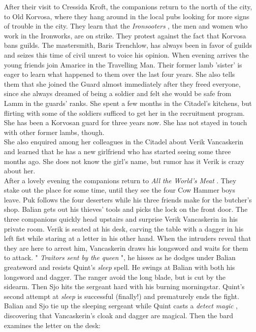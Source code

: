 After their visit to Cressida Kroft, the companions return to the north of the city, to Old Korvosa, where they hang around in the local pubs looking for more signs of trouble in the city. They learn that the {\itshape Ironsooters} , the men and women who work in the Ironworks, are on strike. They protest against the fact that Korvosa bans guilds. The mastersmith, Baris Trenchlow, has always been in favor of guilds and seizes this time of civil unrest to voice his opinion. When evening arrives the young friends join Amarice in the Travelling Man. Their former lamb 'sister' is eager to learn what happened to them over the last four years. She also tells them that she joined the Guard almost immediately after they freed everyone, since she always dreamed of being a soldier and felt she would be safe from Lamm in the guards' ranks. She spent a few months in the Citadel's kitchens, but flirting with some of the soldiers sufficed to get her in the recruitment program. She has been a Korvosan guard for three years now. She has not stayed in touch with other former lambs, though.\\

She also enquired among her colleagues in the Citadel about Verik Vancaskerin and learned that he has a new girlfriend who has started seeing some three months ago. She does not know the girl's name, but rumor has it Verik is crazy about her.\\

After a lovely evening the companions return to {\itshape All the World's Meat} . They stake out the place for some time, until they see the four Cow Hammer boys leave. Puk follows the four deserters while his three friends make for the butcher's shop. Balian gets out his thieves' tools and picks the lock on the front door. The three companions quickly head upstairs and surprise Verik Vancaskerin in his private room. Verik is seated at his desk, carving the table with a dagger in his left fist while staring at a letter in his other hand. When the intruders reveal that they are here to arrest him, Vancaskerin draws his longsword and waits for them to attack. "  {\itshape Traitors sent by the queen} ", he hisses as he dodges under Balian greatsword and resists Quint's  {\itshape sleep} spell. He swings at Balian with both his longsword and dagger. The ranger avoid the long blade, but is cut by the sidearm. Then Sjo hits the sergeant hard with his burning morningstar. Quint's second attempt at  {\itshape sleep} is successful (finally!) and prematurely ends the fight. Balian and Sjo tie up the sleeping sergeant while Quint casts a  {\itshape detect magic} , discovering that Vancaskerin's cloak and dagger are magical. Then the bard examines the letter on the desk:\\

